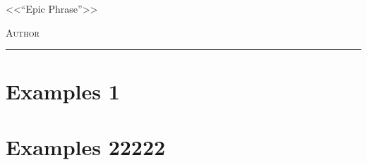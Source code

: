 \documentclass[12pt,a4paper]{book}
\begin{document}
\renewcommand{\contentsname}{\vspace{-1.5cm}\centering Contenido \vspace{-2cm} }


\begin{titlepage}
\vspace*{2cm}

\noindent
\vspace*{0.5cm}

\vspace{1.5cm}
\epigraph{<<``Epic Phrase''>>}%
{ \textsc{Author}}
\null\vfill
\vspace*{1cm}
\noindent
\hfill
\begin{minipage}{0.7\linewidth}
    \begin{flushright}
        \printauthor %
    \end{flushright}
\end{minipage}
%
\begin{minipage}{0.02\linewidth}
    \rule{1pt}{70pt}
\end{minipage}
\titlepagedecoration
\end{titlepage}


\tableofcontents
\cleardoublepage


\chapter{Examples 1}

\chapter{Examples 22222}




\newpage


\nocite{*}
\end{document}
